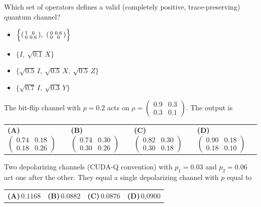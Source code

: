 \documentclass[11pt,a4paper]{article}
\newcommand{\optlabel}[1]{\textbf{(#1)}}
\newenvironment{qitem}[1]{\begin{list}{}{\setlength{\leftmargin}{3.3em}\setlength{\labelwidth}{3.1em}%
  \setlength{\labelsep}{0.2em}\setlength{\topsep}{3pt}\setlength{\parsep}{3pt}}\item[\textbf{Q.#1}\hfill]}{\end{list}}
\newcommand{\qsep}{\par\vspace{2pt}{\color{black!15}\hrule}\vspace{4pt}}
\begin{document}
\begin{qitem}{43}
Which set of operators defines a valid (completely positive, trace-preserving) quantum channel?
\begin{itemize}[leftmargin=2.6em, labelsep=0.4em, itemsep=2pt, topsep=3pt]
\item[\optlabel{A}] $\Big\{\begin{psmallmatrix}1&0\\0&0.6\end{psmallmatrix},\ \begin{psmallmatrix}0&0.6\\0&0\end{psmallmatrix}\Big\}$
\item[\optlabel{B}] $\{I,\ \sqrt{0.1}\,X\}$
\item[\optlabel{C}] $\{\sqrt{0.5}\,I,\ \sqrt{0.5}\,X,\ \sqrt{0.5}\,Z\}$
\item[\optlabel{D}] $\{\sqrt{0.7}\,I,\ \sqrt{0.3}\,Y\}$
\end{itemize}
\end{qitem}
\qsep

\begin{qitem}{44}
The bit-flip channel with $p = 0.2$ acts on $\rho = \begin{pmatrix}0.9 & 0.3\\ 0.3 & 0.1\end{pmatrix}$. The output is
\par\smallskip\noindent\begin{tabularx}{\linewidth}{@{}*{4}{L}@{}}
\optlabel{A}\,$\begin{pmatrix}0.74 & 0.18\\ 0.18 & 0.26\end{pmatrix}$ & \optlabel{B}\,$\begin{pmatrix}0.74 & 0.30\\ 0.30 & 0.26\end{pmatrix}$ & \optlabel{C}\,$\begin{pmatrix}0.82 & 0.30\\ 0.30 & 0.18\end{pmatrix}$ & \optlabel{D}\,$\begin{pmatrix}0.90 & 0.18\\ 0.18 & 0.10\end{pmatrix}$
\end{tabularx}
\end{qitem}
\qsep

\begin{qitem}{45}
Two depolarizing channels (CUDA-Q convention) with $p_1 = 0.03$ and $p_2 = 0.06$ act one after the other. They equal a single depolarizing channel with $p$ equal to
\par\smallskip\noindent\begin{tabularx}{\linewidth}{@{}*{4}{L}@{}}
\optlabel{A}\,$0.1168$ & \optlabel{B}\,$0.0882$ & \optlabel{C}\,$0.0876$ & \optlabel{D}\,$0.0900$
\end{tabularx}
\end{qitem}
\qsep
\end{document}
